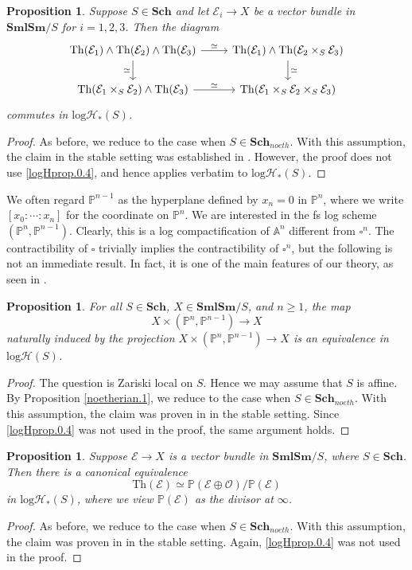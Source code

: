 \documentclass[11pt, a4paper]{amsart}
\newtheorem{prop}[thm]{Proposition}
\theoremstyle{definition}
\numberwithin{equation}{subsection}
\renewcommand{\P}{\mathbb{P}}
\newcommand{\A}{\mathbb{A}}
\newcommand{\Sch}{\mathbf{Sch}}
\newcommand{\SmlSm}{\mathbf{SmlSm}}
\newcommand{\Thom}{\mathrm{Th}}
\newcommand{\cE}{\mathcal{E}}
\newcommand{\cO}{\mathcal{O}}
\newcommand{\boxx}{\square}
\newcommand{\inflogH}{\mathrm{log}\mathcal{H}}
\newcommand{\inflogHpt}{\mathrm{log}\mathcal{H}_\ast}
\begin{document}
\begin{prop}
\label{Ori.65}
Suppose $S\in \Sch$ and let $\cE_i\to X$ be a vector bundle in $\SmlSm/S$ for $i=1,2,3$.
Then the diagram
\[
\begin{tikzcd}
\Thom(\cE_1)\wedge \Thom(\cE_2)\wedge \Thom(\cE_3)\ar[r,"\simeq"]\ar[d,"\simeq"']&
\Thom(\cE_1)\wedge \Thom(\cE_2\times_S \cE_3)\ar[d,"\simeq"]
\\
\Thom(\cE_1\times_S \cE_2)\wedge \Thom(\cE_3)\ar[r,"\simeq"]&
\Thom(\cE_1\times_S \cE_2\times_S \cE_3)
\end{tikzcd}
\]
commutes in $\inflogHpt(S)$.
\end{prop}
\begin{proof}
As before,
we reduce to the case when $S\in \Sch_{noeth}$.
With this assumption, the claim
in the stable setting was established in \cite[Proposition 7.4.16]{logDM}.
However, 
the proof does not use \eqref{logHprop.0.4}, 
and hence applies verbatim to $\inflogHpt(S)$.
\end{proof}

We often regard $\P^{n-1}$ as the hyperplane defined by $x_n=0$ in $\P^n$, 
where we write $[x_0:\cdots:x_n]$ for the coordinate on $\P^n$.
We are interested in the fs log scheme $(\P^n,\P^{n-1})$.\index[notation]{PnPn1 @ $(\P^n,\P^{n-1})$} Clearly, this is a log compactification of $\A^n$ different from $\boxx^n$.
The contractibility of $\boxx$ trivially implies the contractibility of $\boxx^n$, but the following is not an immediate result. In fact, it is one of the main features of our theory, as seen in \cite{logDM}.

\begin{prop}
\label{ProplogSH.4}
For all $S\in \Sch$, 
$X\in \SmlSm/S$, 
and $n\geq 1$, the map
\[
X\times (\P^n,\P^{n-1})
\to
X
\]
naturally induced by the projection $X\times (\P^n,\P^{n-1})\to X$ is an equivalence in $\inflogH(S)$.
\end{prop}
\begin{proof}
The question is Zariski local on $S$.
Hence we may assume that $S$ is affine.
By Proposition \ref{noetherian.1},
we reduce to the case when $S\in \Sch_{noeth}$.
With this assumption, the claim
was proven in \cite[Proposition 7.3.1]{logDM} in the stable setting.
Since \eqref{logHprop.0.4} was not used in the proof, the same argument holds.
\end{proof}


\begin{prop}
\label{Ori.41}
Suppose $\cE\to X$ is a vector bundle in $\SmlSm/S$, where $S\in \Sch$.
Then there is a canonical equivalence
\[
\Thom(\cE)
\simeq
\P(\cE\oplus \cO)/\P(\cE)
\]
in $\inflogHpt(S)$, where we view $\P(\cE)$ as the divisor at $\infty$.
\end{prop}
\begin{proof}
As before,
we reduce to the case when $S\in \Sch_{noeth}$.
With this assumption, the claim
was proven in \cite[Proposition 7.4.5]{logDM} in the stable setting.
Again, \eqref{logHprop.0.4} was not used in the proof.
\end{proof}
\end{document}
